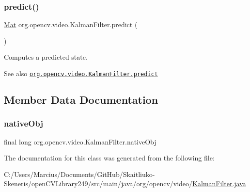 \subsubsection{\texorpdfstring{predict()}{predict()}\hspace{0.1cm}{\footnotesize\ttfamily [2/2]}}
{\footnotesize\ttfamily \mbox{\hyperlink{classorg_1_1opencv_1_1core_1_1_mat}{Mat}} org.\+opencv.\+video.\+Kalman\+Filter.\+predict (\begin{DoxyParamCaption}{ }\end{DoxyParamCaption})}

Computes a predicted state.

\begin{DoxySeeAlso}{See also}
\href{http://docs.opencv.org/modules/video/doc/motion_analysis_and_object_tracking.html#kalmanfilter-predict}{\tt org.\+opencv.\+video.\+Kalman\+Filter.\+predict} 
\end{DoxySeeAlso}


\subsection{Member Data Documentation}
\mbox{\label{classorg_1_1opencv_1_1video_1_1_kalman_filter_a7cf49cefeb229d5e91ee31d40dde3104}} 
\subsubsection{\texorpdfstring{native\+Obj}{nativeObj}}
{\footnotesize\ttfamily final long org.\+opencv.\+video.\+Kalman\+Filter.\+native\+Obj\hspace{0.3cm}{\ttfamily [protected]}}



The documentation for this class was generated from the following file\+:\begin{DoxyCompactItemize}
\item 
C\+:/\+Users/\+Marcius/\+Documents/\+Git\+Hub/\+Skaitliuko-\/\+Skeneris/open\+C\+V\+Library249/src/main/java/org/opencv/video/\mbox{\hyperlink{_kalman_filter_8java}{Kalman\+Filter.\+java}}\end{DoxyCompactItemize}
